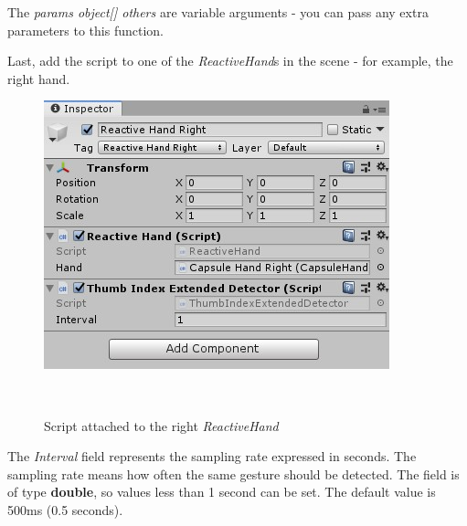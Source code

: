 \documentclass{sigchi}
\begin{document}
The \textit{params object[] others} are variable arguments - you can pass any extra parameters to this function.


Last, add the script to one of the \textit{ReactiveHand}s in the scene - for example, the right hand.

\begin{figure}[h]
  \centering
  \includegraphics[width=0.9\columnwidth]{figures/FluentMotion_script_attached}
  \caption{Script attached to the right \textit{ReactiveHand}}~\label{fig:figure10}
\end{figure}

The \textit{Interval} field represents the sampling rate expressed in seconds. The sampling rate means how often the same gesture should be detected. The field is of type \textbf{double}, so values less than 1 second can be set. The default value is 500ms (0.5 seconds).






\end{document}
